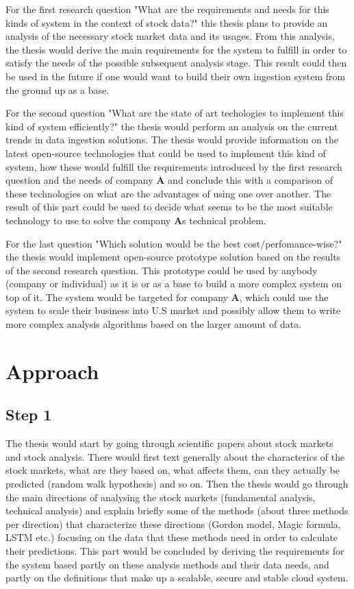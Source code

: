 \documentclass[article,11pt]{article}
\begin{document}
For the first research question "What are the requirements and needs for this kinds of system in the context of stock data?" this thesis plans to provide an analysis of the necessary stock market data and its usages. From this analysis, the thesis would derive the main requirements for the system to fulfill in order to satisfy the needs of the possible subsequent analysis stage. This result could then be used in the future if one would want to build their own ingestion system from the ground up as a base.

For the second question "What are the state of art techologies to implement this kind of system efficiently?" the thesis would perform an analysis on the current trends in data ingestion solutions. The thesis would provide information on the latest open-source technologies that could be used to implement this kind of system, how these would fulfill the requirements introduced by the first research question and the needs of company \textbf{A} and conclude this with a comparison of these technologies on what are the advantages of using one over another. The result of this part could be used to decide what seems to be the most suitable technology to use to solve the company \textbf{A}s technical problem. 

For the last question "Which solution would be the best cost/perfomance-wise?" the thesis would implement open-source prototype solution based on the results of the second research question. This prototype could be used by anybody (company or individual) as it is or as a base to build a more complex system on top of it. The system would be targeted for company \textbf{A}, which could use the system to scale their business into U.S market and possibly allow them to write more complex analysis algorithms based on the larger amount of data.

\section{Approach}

\subsection*{Step 1}

The thesis would start by going through scientific papers about stock markets and stock analysis. There would first text generally about the characterics of the stock markets, what are they based on, what affects them, can they actually be predicted (random walk hypothesis) and so on. Then the thesis would go through the main directions of analysing the stock markets (fundamental analysis, technical analysis) and explain briefly some of the methods (about three methods per direction) that characterize these directions (Gordon model, Magic formula, LSTM etc.) focusing on the data that these methods need in order to calculate their predictions. This part would be concluded by deriving the requirements for the system based partly on these analysis methods and their data needs, and partly on the definitions that make up a scalable, secure and stable cloud system.
\end{document}
